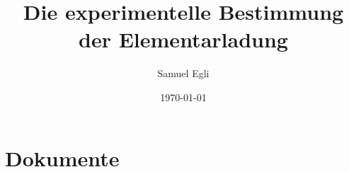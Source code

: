 \documentclass[a4paper,11pt]{report}
\title{Die experimentelle Bestimmung der Elementarladung}
\date{\today}
\author{Samuel Egli}
\begin{document}
	
	
	\onehalfspacing	
	
	
	\tableofcontents %
	\newpage %
	
	\renewcommand{\chaptermark}[1]{\markboth{\MakeUppercase{\thechapter.\ #1}}{}} %
	\renewcommand{\sectionmark}[1]{\markright{\thesection.\ #1}{}} %
	\fancyhead[R]{\rightmark}
	\fancyhead[L]{\leftmark}
	\fancyhead[L]{\leftmark}
	\fancyhead[R]{\rightmark}
	\fancyfoot[C]{\thepage{}}
	\pagestyle{fancy}
	
	
	
	
	
	
	
	
	
	
	
	
	\cleardoublepage
	\listoffigures
	\nocite{github_repo}
	\printbibliography
	
	
	\appendix
	\newpage
	\chapter{Dokumente}
	
	
	
\end{document}
